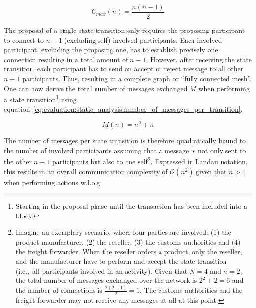 \begin{equation}
\label{eq:evaluation:static_analysis:max_number_of_connections}
C_{max}(n) = \frac{n(n-1)}{2} %
\end{equation}

The proposal of a single state transition only requires the proposing participant to connect to $n - 1$ (excluding self) involved participants. Each involved participant, excluding the proposing one, has to establish precisely one connection resulting in a total amount of $n - 1$. However, after receiving the state transition, each participant has to send an accept or reject message to all other $n - 1$ participants. Thus, resulting in a complete graph or ``fully connected mesh''. One can now derive the total number of messages exchanged $M$ when performing a state transition\footnote{Starting in the proposal phase until the transaction has been included into a block.} using equation~\ref{eq:evaluation:static_analysis:number_of_messages_per_transition}.

\begin{equation}
\label{eq:evaluation:static_analysis:number_of_messages_per_transition}
M(n) = n ^ 2 + n
\end{equation}

The number of messages per state transition is therefore quadratically bound to the number of involved participants assuming that a message is not only sent to the other $n - 1$ participants but also to one self\footnote{Imagine an exemplary scenario, where four parties are involved: (1) the product manufacturer, (2) the reseller, (3) the customs authorities and (4) the freight forwarder. When the reseller orders a product, only the reseller, and the manufacturer have to perform and accept the state transition (i.e.,\ all participants involved in an activity). Given that $N=4$ and $n=2$, the total number of messages exchanged over the network is $2^2+2=6$ and the number of connections is $\frac{2(2-1)}{2}=1$. The customs authorities and the freight forwarder may not receive any messages at all at this point.}. Expressed in Landau notation, this results in an overall communication complexity of $\mathcal{O}(n^2)$ given that $n > 1$ when performing actions w.l.o.g.


